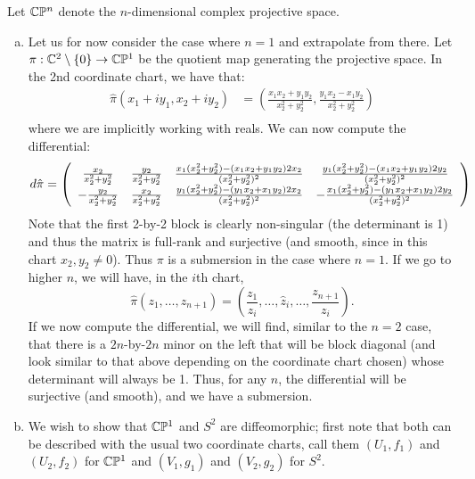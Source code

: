 \documentclass{../../mathnotes}
\begin{document}
Let $\mathbb{C}\mathbb{P}^n$ denote the $n$-dimensional complex projective space. 
\begin{enumerate}[(a)]
    \item Let us for now consider the case where $n=1$ and extrapolate from there.
        Let $\pi:\mathbb{C}^2\setminus\left\{ 0 \right\}\to\mathbb{C}\mathbb{P}^1$ be the quotient map
        generating the projective space. In the 2nd coordinate chart, we have that:
        \begin{align*}
            \hat\pi\left(x_1+iy_1,x_2+iy_2\right)&=\left(\frac{x_1x_2+y_1y_2}{x_2^2+y_2^2},\frac{y_1x_2-x_1y_2}{x_2^2+y_2^2}\right)\\
        \end{align*}
        where we are implicitly working with reals. We can now compute the differential:
        \begin{align*}
            d\hat\pi=\left(
            \begin{array}[]{cccc}
                \frac{x_2}{x_2^2+y_2^2} & \frac{y_2}{x_2^2+y_2^2} & \frac{x_1(x_2^2+y_2^2)-(x_1x_2+y_1y_2)2x_2}{(x_2^2+y_2^2)^2} & \frac{y_1(x_2^2+y_2^2)-(x_1x_2+y_1y_2)2y_2}{(x_2^2+y_2^2)^2}\\
                -\frac{y_2}{x_2^2+y_2^2} & \frac{x_2}{x_2^2+y_2^2} & \frac{y_1(x_2^2+y_2^2)-(y_1x_2+x_1y_2)2x_2}{(x_2^2+y_2^2)^2} & -\frac{x_1(x_2^2+y_2^2)-(y_1x_2+x_1y_2)2y_2}{(x_2^2+y_2^2)^2}
            \end{array}
            \right)
        \end{align*}
        Note that the first 2-by-2 block is clearly non-singular (the determinant is 1) and thus the matrix is full-rank
        and surjective (and smooth, since in this chart $x_2,y_2\neq 0$). Thus $\pi$ is a submersion in the case where $n=1$.
        If we go to higher $n$, we will have, in the $i$th chart,
        \[\hat\pi(z_1,\ldots,z_{n+1})=\left( \frac{z_1}{z_i},\ldots,\hat z_i,\ldots,\frac{z_{n+1}}{z_i} \right).\]
        If we now compute the differential, we will find, similar to the $n=2$ case, that there is a $2n$-by-$2n$ minor on the left
        that will be block diagonal (and look similar to that above depending on the coordinate chart chosen) whose determinant
        will always be 1. Thus, for any $n$, the differential will be surjective (and smooth), and we have a submersion.
    \item We wish to show that $\mathbb{C}\mathbb{P}^1$ and $S^2$ are diffeomorphic; first note that both can be described with the usual two coordinate charts,
        call them $(U_1,f_1)$ and $(U_2,f_2)$ for $\mathbb{C}\mathbb{P}^1$ and $(V_1,g_1)$ and $(V_2, g_2)$ for $S^2$. 

\end{enumerate}
\end{document}
